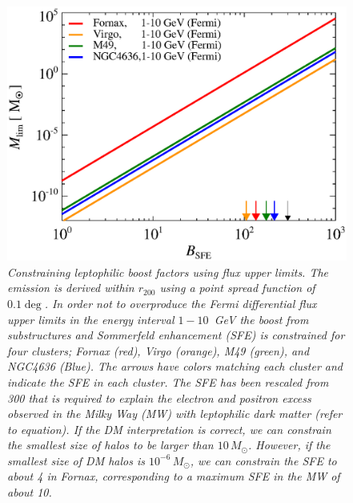 \documentclass[10pt,aps,pra,reprint,amsmath,amsfonts,amssymb,showpacs]{revtex4-1}
\newcommand{\msun}{M_\odot}
\newcommand{\rvir}{r_{200}}
\begin{document}
\begin{figure}%
 \includegraphics[width=0.99\columnwidth]{figures/LP.const.diff.v9.0.1deg.1.6T.SubMass.SF300.IR2.noMW.woGal.eps}
\caption{\it Constraining leptophilic boost factors using flux upper
  limits. The emission is derived within $\rvir$ using a point spread
  function of $0.1\deg$. In order not to overproduce the Fermi
  differential flux upper limits in the energy interval $1-10$~GeV the
  boost from substructures and Sommerfeld enhancement (SFE) is
  constrained for four clusters; Fornax (red), Virgo (orange), M49
  (green), and NGC4636 (Blue). The arrows have colors matching each
  cluster and indicate the SFE in each cluster. The SFE has been
  rescaled from 300 that is required to explain the electron and
  positron excess observed in the Milky Way (MW) with leptophilic dark
  matter (refer to equation). If the DM interpretation is correct, we
  can constrain the smallest size of halos to be larger than
  $10\,\msun$. However, if the smallest size of DM halos is
  $10^{-6}\,\msun$, we can constrain the SFE to about 4 in Fornax,
  corresponding to a maximum SFE in the MW of about 10.}
 \label{fig10}
\end{figure}
\end{document}
